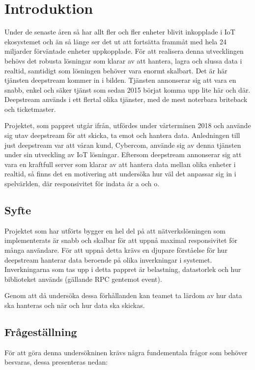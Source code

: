 \section{Introduktion}

Under de senaste åren så har allt fler och fler enheter blivit inkopplade i IoT ekosystemet och än så länge ser det ut att fortsätta frammåt med hela 24 miljarder förväntade enheter uppkopplade\cite{IoT-ecosystem}. För att realisera denna utvecklingen behövs det robusta lösningar som klarar av att hantera, lagra och slussa data i realtid, samtidigt som lösningen behöver vara enormt skalbart. Det är här tjänsten deepstream\cite{deepstream} kommer in i bilden. Tjänsten annonserar sig att vara en snabb, enkel och säker tjänst som sedan 2015 börjat komma upp lite här och där. Deepstream används i ett flertal olika tjänster, med de mest noterbara briteback och ticketmaster\cite{ds-usecases}.

Projektet, som pappret utgår ifrån, utfördes under vårterminen 2018 och använde sig utav deepstream för att skicka, ta emot och hantera data. Anledningen till just deepstream var att våran kund, Cybercom, använde sig av denna tjänsten under sin utveckling av IoT lösningar. Eftersom deepstream annonserar sig att vara en kraftfull server som klarar av att hantera data mellan olika enheter i realtid, så finns det en motivering att undersöka hur väl det anpassar sig in i spelvärlden, där responsivitet för indata är a och o.

\subsection{Syfte}
\label{subsec:tim-aim}
Projektet som har utförts bygger en hel del på att nätverkslösningen som implementerats är snabb och skalbar för att uppnå maximal responsivitet för många användare. För att uppnå detta krävs en djupare förståelse för hur deepstream hanterar data beroende på olika inverkningar i systemet. Inverkningarna som tas upp i detta pappret är belastning, datastorlek och hur biblioteket används (gällande RPC gentemot event).

Genom att då undersöka dessa förhållanden kan teamet ta lärdom av hur data ska hanteras och när och hur data ska skickas.

\subsection{Frågeställning}
\label{subsec:tim-research-questions}
För att göra denna undersökninen krävs några fundementala frågor som behöver besvaras, dessa presenteras nedan:

